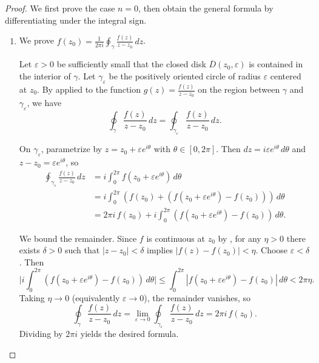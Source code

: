 \begin{proof}
    We first prove the case $n = 0$, then obtain the general formula by differentiating under the integral sign.

    \begin{enumerate}
        \item We prove $f(z_0) = \frac{1}{2\pi i} \oint_{\gamma} \frac{f(z)}{z - z_0}\,dz$.

        Let $\varepsilon > 0$ be sufficiently small that the closed disk $\overline{D}(z_0, \varepsilon)$ is contained in the interior of $\gamma$. Let $\gamma_\varepsilon$ be the positively oriented circle of radius $\varepsilon$ centered at $z_0$. By  applied to the function $g(z) = \frac{f(z)}{z - z_0}$ on the region between $\gamma$ and $\gamma_\varepsilon$, we have
        $$\oint_{\gamma} \frac{f(z)}{z - z_0}\,dz = \oint_{\gamma_\varepsilon} \frac{f(z)}{z - z_0}\,dz.$$

        On $\gamma_\varepsilon$, parametrize by $z = z_0 + \varepsilon e^{i\theta}$ with $\theta \in [0, 2\pi]$. Then $dz = i\varepsilon e^{i\theta}\,d\theta$ and $z - z_0 = \varepsilon e^{i\theta}$, so
        \begin{align*}
            \oint_{\gamma_\varepsilon} \frac{f(z)}{z - z_0}\,dz &= i \int_0^{2\pi} f(z_0 + \varepsilon e^{i\theta})\,d\theta \\
            &= i \int_0^{2\pi} (f(z_0) + (f(z_0 + \varepsilon e^{i\theta}) - f(z_0)))\,d\theta \\
            &= 2\pi i\, f(z_0) + i \int_0^{2\pi} (f(z_0 + \varepsilon e^{i\theta}) - f(z_0))\,d\theta.
        \end{align*}

        We bound the remainder. Since $f$ is continuous at $z_0$ by , for any $\eta > 0$ there exists $\delta > 0$ such that $|z - z_0| < \delta$ implies $|f(z) - f(z_0)| < \eta$. Choose $\varepsilon < \delta$. Then
        $$\bigl| i \int_0^{2\pi} (f(z_0 + \varepsilon e^{i\theta}) - f(z_0))\,d\theta \bigr| \leq \int_0^{2\pi} |f(z_0 + \varepsilon e^{i\theta}) - f(z_0)|\,d\theta < 2\pi \eta.$$
        Taking $\eta \to 0$ (equivalently $\varepsilon \to 0$), the remainder vanishes, so
        $$\oint_{\gamma} \frac{f(z)}{z - z_0}\,dz = \lim_{\varepsilon \to 0} \oint_{\gamma_\varepsilon} \frac{f(z)}{z - z_0}\,dz = 2\pi i\, f(z_0).$$
        Dividing by $2\pi i$ yields the desired formula.


\end{enumerate}
\end{proof}
